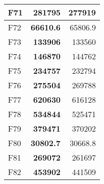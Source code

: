 \begin{table}[]
\begin{tabular}{l|r|r|}
\multicolumn{1}{|l|}{\cellcolor[HTML]{FCE6AB}F71}  & \cellcolor[HTML]{D3FFB6}\textbf{281795}                  & 277919                                                    \\ \hline
\multicolumn{1}{|l|}{\cellcolor[HTML]{FCE6AB}F72}  & \cellcolor[HTML]{D3FFB6}\textbf{66610.6}                 & 65806.9                                                   \\ \hline
\multicolumn{1}{|l|}{\cellcolor[HTML]{FCE6AB}F73}  & \cellcolor[HTML]{D3FFB6}\textbf{133906}                  & 133560                                                    \\ \hline
\multicolumn{1}{|l|}{\cellcolor[HTML]{FCE6AB}F74}  & \cellcolor[HTML]{D3FFB6}\textbf{146870}                  & 144762                                                    \\ \hline
\multicolumn{1}{|l|}{\cellcolor[HTML]{FCE6AB}F75}  & \cellcolor[HTML]{D3FFB6}\textbf{234757}                  & 232794                                                    \\ \hline
\multicolumn{1}{|l|}{\cellcolor[HTML]{FCE6AB}F76}  & \cellcolor[HTML]{D3FFB6}\textbf{275504}                  & 269788                                                    \\ \hline
\multicolumn{1}{|l|}{\cellcolor[HTML]{FCE6AB}F77}  & \cellcolor[HTML]{D3FFB6}\textbf{620630}                  & 616128                                                    \\ \hline
\multicolumn{1}{|l|}{\cellcolor[HTML]{FCE6AB}F78}  & \cellcolor[HTML]{D3FFB6}\textbf{534844}                  & 525471                                                    \\ \hline
\multicolumn{1}{|l|}{\cellcolor[HTML]{FCE6AB}F79}  & \cellcolor[HTML]{D3FFB6}\textbf{379471}                  & 370202                                                    \\ \hline
\multicolumn{1}{|l|}{\cellcolor[HTML]{FCE6AB}F80}  & \cellcolor[HTML]{D3FFB6}\textbf{30802.7}                 & 30668.8                                                   \\ \hline
\multicolumn{1}{|l|}{\cellcolor[HTML]{FCE6AB}F81}  & \cellcolor[HTML]{D3FFB6}\textbf{269072}                  & 261697                                                    \\ \hline
\multicolumn{1}{|l|}{\cellcolor[HTML]{FCE6AB}F82}  & \cellcolor[HTML]{D3FFB6}\textbf{453902}                  & 441509                                                    \\ \hline

\end{tabular}
\end{table}
